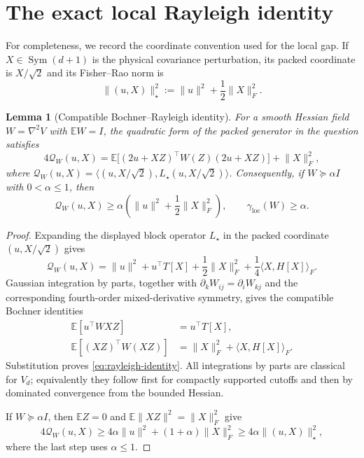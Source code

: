 \documentclass[11pt]{article}
\numberwithin{equation}{section}
\newtheorem{lemma}[theorem]{Lemma}
\newcommand{\E}{\mathbb E}
\newcommand{\loc}{\mathrm{loc}}
\begin{document}
\section{The exact local Rayleigh identity}

For completeness, we record the coordinate convention used for the local
gap.  If $X\in\operatorname{Sym}(d+1)$ is the physical covariance
perturbation, its packed coordinate is $X/\sqrt2$ and its Fisher--Rao norm is
\begin{equation}\label{eq:FRnorm}
  \lVert(u,X)\rVert_\star^2
  :=\lVert u\rVert^2+\frac12\lVert X\rVert_F^2.
\end{equation}

\begin{lemma}[Compatible Bochner--Rayleigh identity]\label{lem:rayleigh}
For a smooth Hessian field $W=\nabla^2V$ with $\E W=I$, the quadratic form of
the packed generator in the question satisfies
\begin{equation}\label{eq:rayleigh-identity}
  4\mathcal Q_W(u,X)
  =\E\big[(2u+XZ)^\top W(Z)(2u+XZ)\big]+\lVert X\rVert_F^2,
\end{equation}
where
$\mathcal Q_W(u,X)=\langle(u,X/\sqrt2),L_\star(u,X/\sqrt2)\rangle$.
Consequently, if $W\succeq\alpha I$ with $0<\alpha\le1$, then
\begin{equation}\label{eq:alpha-floor}
  \mathcal Q_W(u,X)\ge
  \alpha\left(\lVert u\rVert^2+\frac12\lVert X\rVert_F^2\right),
  \qquad
  \gamma_{\loc}(W)\ge\alpha.
\end{equation}
\end{lemma}

\begin{proof}
Expanding the displayed block operator $L_\star$ in the packed coordinate
$(u,X/\sqrt2)$ gives
\[
  \mathcal Q_W(u,X)
  =\lVert u\rVert^2+u^\top T[X]
   +\frac12\lVert X\rVert_F^2+\frac14\langle X,H[X]\rangle_F.
\]
Gaussian integration by parts, together with
$\partial_kW_{ij}=\partial_iW_{kj}$ and the corresponding fourth-order
mixed-derivative symmetry, gives the compatible Bochner identities
\begin{align*}
  \E[u^\top W XZ]&=u^\top T[X],\\
  \E[(XZ)^\top W(XZ)]
    &=\lVert X\rVert_F^2+\langle X,H[X]\rangle_F.
\end{align*}
Substitution proves \eqref{eq:rayleigh-identity}.  All integrations by parts
are classical for $V_d$; equivalently they follow first for compactly
supported cutoffs and then by dominated convergence from the bounded Hessian.

If $W\succeq\alpha I$, then $\E Z=0$ and
$\E\lVert XZ\rVert^2=\lVert X\rVert_F^2$ give
\[
  4\mathcal Q_W(u,X)
  \ge4\alpha\lVert u\rVert^2+(1+\alpha)\lVert X\rVert_F^2
  \ge4\alpha\lVert(u,X)\rVert_\star^2,
\]
where the last step uses $\alpha\le1$.
\end{proof}
\end{document}

